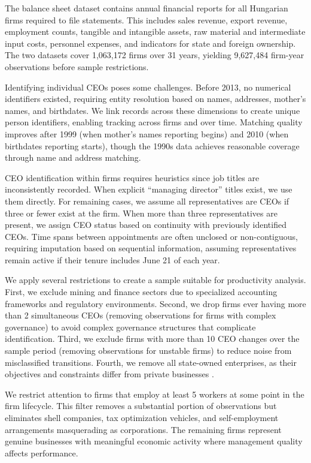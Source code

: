 \documentclass[11pt,a4paper]{article}
\begin{document}
The balance sheet dataset contains annual financial reports for all Hungarian firms required to file statements. This includes sales revenue, export revenue, employment counts, tangible and intangible assets, raw material and intermediate input costs, personnel expenses, and indicators for state and foreign ownership. The two datasets cover 1,063,172 firms over 31 years, yielding 9,627,484 firm-year observations before sample restrictions.

Identifying individual CEOs poses some challenges. Before 2013, no numerical identifiers existed, requiring entity resolution based on names, addresses, mother's names, and birthdates. We link records across these dimensions to create unique person identifiers, enabling tracking across firms and over time. Matching quality improves after 1999 (when mother's names reporting begins) and 2010 (when birthdates reporting starts), though the 1990s data achieves reasonable coverage through name and address matching. 

CEO identification within firms requires heuristics since job titles are inconsistently recorded. When explicit ``managing director'' titles exist, we use them directly. For remaining cases, we assume all representatives are CEOs if three or fewer exist at the firm. When more than three representatives are present, we assign CEO status based on continuity with previously identified CEOs. Time spans between appointments are often unclosed or non-contiguous, requiring imputation based on sequential information, assuming representatives remain active if their tenure includes June 21 of each year.

We apply several restrictions to create a sample suitable for productivity analysis. First, we exclude mining and finance sectors due to specialized accounting frameworks and regulatory environments. Second, we drop firms ever having more than 2 simultaneous CEOs (removing observations for firms with complex governance) to avoid complex governance structures that complicate identification. Third, we exclude firms with more than 10 CEO changes over the sample period (removing observations for unstable firms) to reduce noise from misclassified transitions. Fourth, we remove all state-owned enterprises, as their objectives and constraints differ from private businesses \citep{orban2019inception}.

We restrict attention to firms that employ at least 5 workers at some point in the firm lifecycle. This filter removes a substantial portion of observations but eliminates shell companies, tax optimization vehicles, and self-employment arrangements masquerading as corporations. The remaining firms represent genuine businesses with meaningful economic activity where management quality affects performance.
\end{document}
